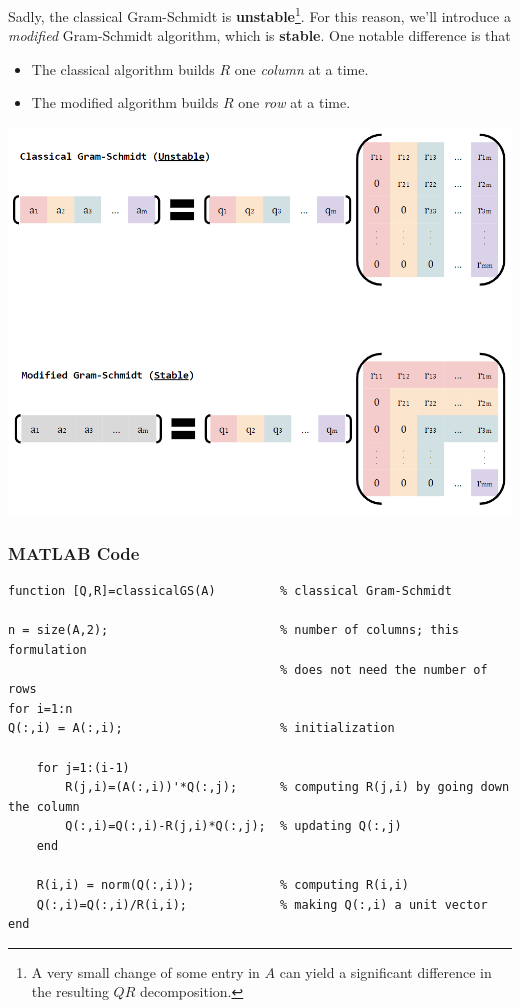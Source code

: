\documentclass[letterpaper]{article}
\newcommand{\0}{\mathbf{0}}
\begin{document}
\bigskip 

Sadly, the classical Gram-Schmidt is \textbf{unstable}\footnote{A very small change of some entry in $A$ can yield a significant difference in the resulting $QR$ decomposition.}. For this reason, we'll introduce a \emph{modified} Gram-Schmidt algorithm, which is \textbf{stable}. One notable difference is that 
\begin{itemize}
    \item The classical algorithm builds $R$ one \emph{column} at a time. 
    \item The modified algorithm builds $R$ one \emph{row} at a time.
\end{itemize}
\begin{center}
    \includegraphics[scale=0.75]{assets/gram.png}
\end{center}

\subsubsection{MATLAB Code}
\begin{mdframed}
    \begin{verbatim}
function [Q,R]=classicalGS(A)         % classical Gram-Schmidt

n = size(A,2);                        % number of columns; this formulation
                                      % does not need the number of rows
for i=1:n                             
Q(:,i) = A(:,i);                      % initialization
   
    for j=1:(i-1)
        R(j,i)=(A(:,i))'*Q(:,j);      % computing R(j,i) by going down the column
        Q(:,i)=Q(:,i)-R(j,i)*Q(:,j);  % updating Q(:,j)
    end
   
    R(i,i) = norm(Q(:,i));            % computing R(i,i) 
    Q(:,i)=Q(:,i)/R(i,i);             % making Q(:,i) a unit vector
end
    \end{verbatim}
\end{mdframed}
\end{document}
